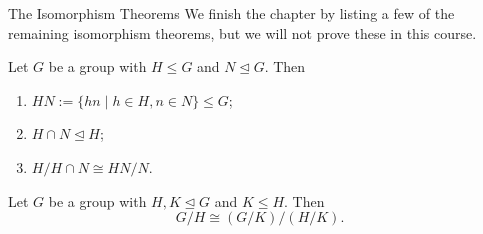 \begin{section}{The Isomorphism Theorems}
We finish the chapter by listing a few of the remaining isomorphism theorems, but we will not prove these in this course.

\begin{theorem}
Let $G$ be a group with $H\leq G$ and $N\trianglelefteq G$.  Then
\begin{enumerate}[label=\rm{(\alph*)}]
\item $HN:=\{hn\mid h\in H, n\in N\}\leq G$;
\item $H\cap N\trianglelefteq H$;
\item $\displaystyle H/H\cap N\cong HN/N$.
\end{enumerate}
\end{theorem}

\begin{theorem}
Let $G$ be a group with $H,K\trianglelefteq G$ and $K\leq H$.  Then
\[
G/H\cong (G/K)/(H/K).
\]
\end{theorem}

\end{section}